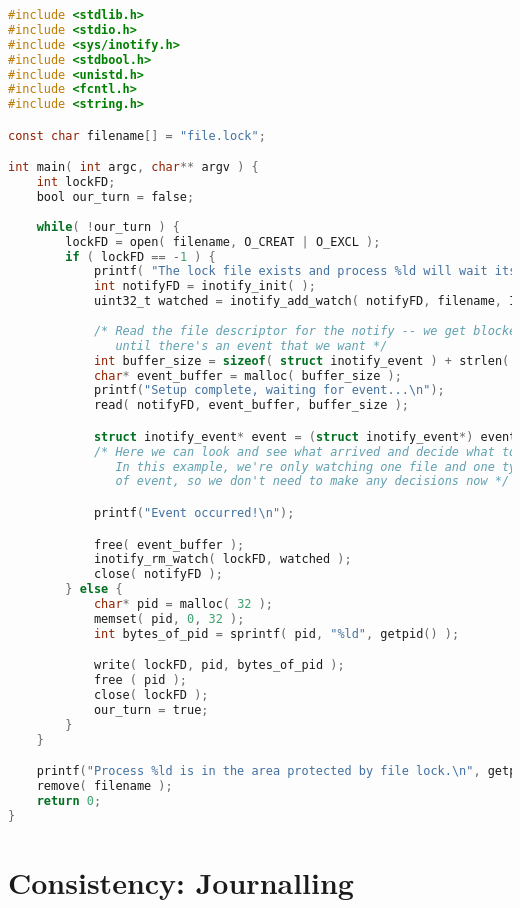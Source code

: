 \begin{lstlisting}[language=C]
#include <stdlib.h>
#include <stdio.h>
#include <sys/inotify.h>
#include <stdbool.h>
#include <unistd.h>
#include <fcntl.h>
#include <string.h>

const char filename[] = "file.lock";

int main( int argc, char** argv ) {
    int lockFD;
    bool our_turn = false;
    
    while( !our_turn ) {
        lockFD = open( filename, O_CREAT | O_EXCL );
        if ( lockFD == -1 ) {
            printf( "The lock file exists and process %ld will wait its turn...\n", getpid() ); 
            int notifyFD = inotify_init( );
            uint32_t watched = inotify_add_watch( notifyFD, filename, IN_DELETE_SELF );
            
            /* Read the file descriptor for the notify -- we get blocked here
               until there's an event that we want */
            int buffer_size = sizeof( struct inotify_event ) + strlen( filename ) + 1;
            char* event_buffer = malloc( buffer_size );
            printf("Setup complete, waiting for event...\n");
            read( notifyFD, event_buffer, buffer_size );

            struct inotify_event* event = (struct inotify_event*) event_buffer;
            /* Here we can look and see what arrived and decide what to do.
               In this example, we're only watching one file and one type
               of event, so we don't need to make any decisions now */

            printf("Event occurred!\n");

            free( event_buffer );
            inotify_rm_watch( lockFD, watched );
            close( notifyFD );
        } else {
            char* pid = malloc( 32 );
            memset( pid, 0, 32 );
            int bytes_of_pid = sprintf( pid, "%ld", getpid() );

            write( lockFD, pid, bytes_of_pid ); 
            free ( pid );
            close( lockFD );
            our_turn = true; 
        }
    } 

    printf("Process %ld is in the area protected by file lock.\n", getpid());
    remove( filename );
    return 0;
}
\end{lstlisting}

\section*{Consistency: Journalling}

